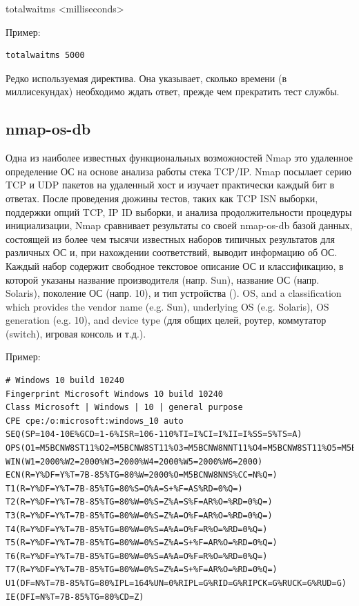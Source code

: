 \documentclass[12pt,a4paper]{report}
\begin{document}
totalwaitms <milliseconds>

Пример:
\begin{verbatim}
totalwaitms 5000
\end{verbatim}
Редко используемая директива. Она указывает, сколько времени (в миллисекундах) необходимо ждать ответ, прежде чем прекратить тест службы.



\subsection*{nmap-os-db}

Одна из наиболее известных функциональных возможностей Nmap это удаленное определение ОС на основе анализа работы стека TCP/IP. Nmap посылает серию TCP и UDP пакетов на удаленный хост и изучает практически каждый бит в ответах. После проведения дюжины тестов, таких как TCP ISN выборки, поддержки опций TCP, IP ID выборки, и анализа продолжительности процедуры инициализации, Nmap сравнивает результаты со своей nmap-os-db базой данных, состоящей из более чем тысячи известных наборов типичных результатов для различных ОС и, при нахождении соответствий, выводит информацию об ОС. Каждый набор содержит свободное текстовое описание ОС и классификацию, в которой указаны название производителя (напр. Sun), название ОС (напр. Solaris), поколение ОС (напр. 10), и тип устройства (). OS, and a classification which provides the vendor name (e.g. Sun), underlying OS (e.g. Solaris), OS generation (e.g. 10), and device type (для общих целей, роутер, коммутатор (switch), игровая консоль и т.д.).

Пример:
\begin{lstlisting}[breaklines]
# Windows 10 build 10240
Fingerprint Microsoft Windows 10 build 10240
Class Microsoft | Windows | 10 | general purpose
CPE cpe:/o:microsoft:windows_10 auto
SEQ(SP=104-10E%GCD=1-6%ISR=106-110%TI=I%CI=I%II=I%SS=S%TS=A)
OPS(O1=M5BCNW8ST11%O2=M5BCNW8ST11%O3=M5BCNW8NNT11%O4=M5BCNW8ST11%O5=M5BCNW8ST11%O6=M5BCST11)
WIN(W1=2000%W2=2000%W3=2000%W4=2000%W5=2000%W6=2000)
ECN(R=Y%DF=Y%T=7B-85%TG=80%W=2000%O=M5BCNW8NNS%CC=N%Q=)
T1(R=Y%DF=Y%T=7B-85%TG=80%S=O%A=S+%F=AS%RD=0%Q=)
T2(R=Y%DF=Y%T=7B-85%TG=80%W=0%S=Z%A=S%F=AR%O=%RD=0%Q=)
T3(R=Y%DF=Y%T=7B-85%TG=80%W=0%S=Z%A=O%F=AR%O=%RD=0%Q=)
T4(R=Y%DF=Y%T=7B-85%TG=80%W=0%S=A%A=O%F=R%O=%RD=0%Q=)
T5(R=Y%DF=Y%T=7B-85%TG=80%W=0%S=Z%A=S+%F=AR%O=%RD=0%Q=)
T6(R=Y%DF=Y%T=7B-85%TG=80%W=0%S=A%A=O%F=R%O=%RD=0%Q=)
T7(R=Y%DF=Y%T=7B-85%TG=80%W=0%S=Z%A=S+%F=AR%O=%RD=0%Q=)
U1(DF=N%T=7B-85%TG=80%IPL=164%UN=0%RIPL=G%RID=G%RIPCK=G%RUCK=G%RUD=G)
IE(DFI=N%T=7B-85%TG=80%CD=Z)
\end{lstlisting}
\end{document}
